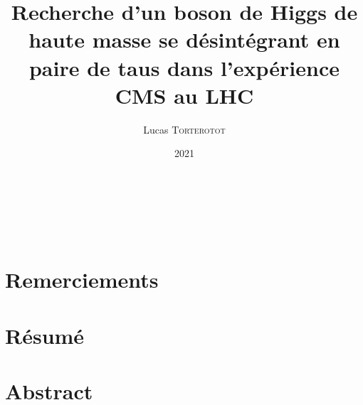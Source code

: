 \documentclass[11pt,a4paper,twoside]{book}
\institute[UCBL]{Université Claude Bernard Lyon 1} %
\title{Recherche d'un boson de Higgs de haute masse se désintégrant en paire de taus dans l'expérience CMS au LHC}
\author[L. \textsc{Torterotot}]{Lucas \textsc{Torterotot}}
\date{\todo{XX xxxx} 2021}
\begin{document}
\pagestyle{empty}

\cleardoublepage
~\vfill
\begin{flushright}
\end{flushright}
\vfill\vfill~
\cleardoublepage
\chapter*{Remerciements}\thispagestyle{empty}\pagestyle{empty}

\cleardoublepage
\chapter*{Résumé}\thispagestyle{empty}\pagestyle{empty}

\chapter*{Abstract}\thispagestyle{empty}\pagestyle{empty}

\cleardoublepage
\frontmatter
{\hypersetup{linkcolor=black}
\tableofcontents
\listoffigures
\listoftables}
\mainmatter



\appendix

\backmatter
\printbibliography
\end{document}
